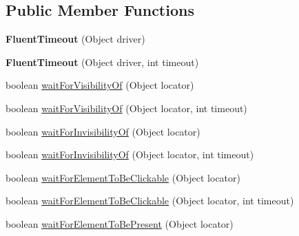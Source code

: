 \subsection*{Public Member Functions}
\begin{DoxyCompactItemize}
\item 
\hypertarget{classcom_1_1zeuslearning_1_1automation_1_1selenium_1_1interactions_1_1FluentTimeout_a3a8d8efcfac94ce9f55eff88bab004e6}{}\label{classcom_1_1zeuslearning_1_1automation_1_1selenium_1_1interactions_1_1FluentTimeout_a3a8d8efcfac94ce9f55eff88bab004e6} 
{\bfseries Fluent\+Timeout} (Object driver)
\item 
\hypertarget{classcom_1_1zeuslearning_1_1automation_1_1selenium_1_1interactions_1_1FluentTimeout_a3f723a869ada70d5c59f80bb4b850b49}{}\label{classcom_1_1zeuslearning_1_1automation_1_1selenium_1_1interactions_1_1FluentTimeout_a3f723a869ada70d5c59f80bb4b850b49} 
{\bfseries Fluent\+Timeout} (Object driver, int timeout)
\item 
boolean \hyperlink{classcom_1_1zeuslearning_1_1automation_1_1selenium_1_1interactions_1_1FluentTimeout_a189fae4d5e9985013b0e1b65c3d73d1f}{wait\+For\+Visibility\+Of} (Object locator)
\item 
boolean \hyperlink{classcom_1_1zeuslearning_1_1automation_1_1selenium_1_1interactions_1_1FluentTimeout_aa8a8afef31ddc1e6bcd5238005a732ec}{wait\+For\+Visibility\+Of} (Object locator, int timeout)
\item 
boolean \hyperlink{classcom_1_1zeuslearning_1_1automation_1_1selenium_1_1interactions_1_1FluentTimeout_ad385151878bb0bd5e034cb4769c206f5}{wait\+For\+Invisibility\+Of} (Object locator)
\item 
boolean \hyperlink{classcom_1_1zeuslearning_1_1automation_1_1selenium_1_1interactions_1_1FluentTimeout_aa8c541ab4503e1c0bb835545e4ad717d}{wait\+For\+Invisibility\+Of} (Object locator, int timeout)
\item 
boolean \hyperlink{classcom_1_1zeuslearning_1_1automation_1_1selenium_1_1interactions_1_1FluentTimeout_ad9a51efbd23459b848e9640fe0f9a3db}{wait\+For\+Element\+To\+Be\+Clickable} (Object locator)
\item 
boolean \hyperlink{classcom_1_1zeuslearning_1_1automation_1_1selenium_1_1interactions_1_1FluentTimeout_adce608907ac37820819c4e4f7120c733}{wait\+For\+Element\+To\+Be\+Clickable} (Object locator, int timeout)
\item 
boolean \hyperlink{classcom_1_1zeuslearning_1_1automation_1_1selenium_1_1interactions_1_1FluentTimeout_a83338a2e6ff1028ec988d6122e4afeab}{wait\+For\+Element\+To\+Be\+Present} (Object locator)

\end{DoxyCompactItemize}
